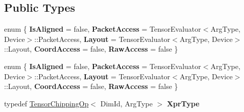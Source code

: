 \subsection*{Public Types}
\begin{DoxyCompactItemize}
\item 
\mbox{\label{struct_eigen_1_1_tensor_evaluator_3_01const_01_tensor_chipping_op_3_01_dim_id_00_01_arg_type_01_4_00_01_device_01_4_a6af345aea9eaf21d15babe73ab8b2872}} 
enum \{ \newline
{\bfseries Is\+Aligned} = false, 
{\bfseries Packet\+Access} = Tensor\+Evaluator$<$Arg\+Type, Device$>$\+:\+:Packet\+Access, 
{\bfseries Layout} = Tensor\+Evaluator$<$Arg\+Type, Device$>$\+:\+:Layout, 
{\bfseries Coord\+Access} = false, 
\newline
{\bfseries Raw\+Access} = false
 \}
\item 
\mbox{\label{struct_eigen_1_1_tensor_evaluator_3_01const_01_tensor_chipping_op_3_01_dim_id_00_01_arg_type_01_4_00_01_device_01_4_ad0413bb0437f60d04f1b324346a82521}} 
enum \{ \newline
{\bfseries Is\+Aligned} = false, 
{\bfseries Packet\+Access} = Tensor\+Evaluator$<$Arg\+Type, Device$>$\+:\+:Packet\+Access, 
{\bfseries Layout} = Tensor\+Evaluator$<$Arg\+Type, Device$>$\+:\+:Layout, 
{\bfseries Coord\+Access} = false, 
\newline
{\bfseries Raw\+Access} = false
 \}
\item 
\mbox{\label{struct_eigen_1_1_tensor_evaluator_3_01const_01_tensor_chipping_op_3_01_dim_id_00_01_arg_type_01_4_00_01_device_01_4_a4fdf03f389f4114412c60ee7200e322c}} 
typedef \hyperlink{class_eigen_1_1_tensor_chipping_op}{Tensor\+Chipping\+Op}$<$ Dim\+Id, Arg\+Type $>$ {\bfseries Xpr\+Type}
\item 
\mbox{\label{struct_eigen_1_1_tensor_evaluator_3_01const_01_tensor_chipping_op_3_01_dim_id_00_01_arg_type_01_4_00_01_device_01_4_a73da3ba81da10b25138b32e790488cde}} 

\end{DoxyCompactItemize}
